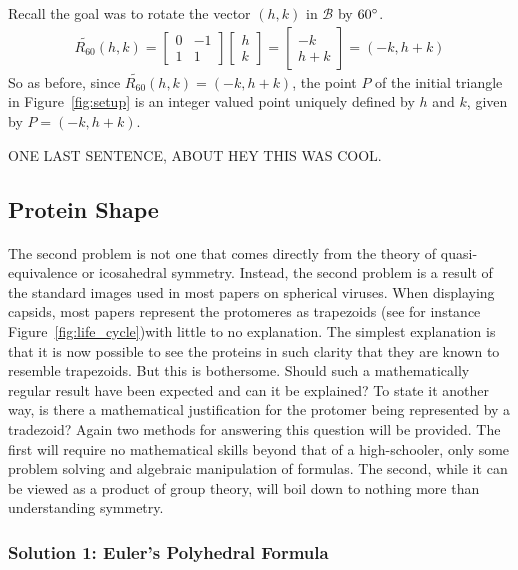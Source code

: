 \documentclass[12pt,letter]{article}
\begin{document}
%
Recall the goal was to rotate the vector $(h,k)$ in $\mathcal{B}$ by $60\degree$. 
%
\begin{align*}
	\widetilde{R_{60}}(h,k) =
	\begin{bmatrix}
		0 & -1 \\
		1 & 1
	\end{bmatrix}
	\begin{bmatrix}
		h \\ k
	\end{bmatrix} = 
	\begin{bmatrix}
		-k \\ h + k
	\end{bmatrix} =
	(-k , h + k)
\end{align*}
So as before, since $\widetilde{R_{60}}(h,k) = (-k , h + k)$, the point $P$ of the initial triangle in Figure~\ref{fig:setup} is an integer valued point uniquely defined by $h$ and $k$, given by $P = (-k , h + k)$.

ONE LAST SENTENCE, ABOUT HEY THIS WAS COOL.
\subsection{Protein Shape}
\paragraph{}
The second problem is not one that comes directly from the theory of quasi-equivalence or icosahedral symmetry. Instead, the second problem is a result of the standard images used in most papers on spherical viruses. When displaying capsids, most papers represent the protomeres as trapezoids (see for instance Figure~\ref{fig:life_cycle})with little to no explanation. The simplest explanation is that it is now possible to see the proteins in such clarity that they are known to resemble trapezoids. But this is bothersome. Should such a mathematically regular result have been expected and can it be explained? To state it another way, is there a mathematical justification for the protomer being represented by a tradezoid? Again two methods for answering this question will be provided. The first will require no mathematical skills beyond that of a high-schooler, only some problem solving and algebraic manipulation of formulas. The second, while it can be viewed as a product of group theory, will boil down to nothing more than understanding symmetry.

\subsubsection{Solution 1: Euler's Polyhedral Formula}
\end{document}
